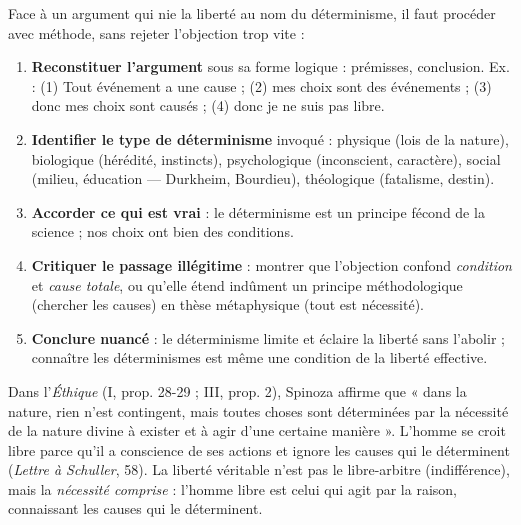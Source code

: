 \documentclass[11pt]{article}
\begin{document}
\begin{methode}
Face à un argument qui nie la liberté au nom du déterminisme, il faut procéder avec méthode, sans rejeter l'objection trop vite :
\begin{enumerate}
\item \textbf{Reconstituer l'argument} sous sa forme logique : prémisses, conclusion. Ex. : (1) Tout événement a une cause ; (2) mes choix sont des événements ; (3) donc mes choix sont causés ; (4) donc je ne suis pas libre.
\item \textbf{Identifier le type de déterminisme} invoqué : physique (lois de la nature), biologique (hérédité, instincts), psychologique (inconscient, caractère), social (milieu, éducation — Durkheim, Bourdieu), théologique (fatalisme, destin).
\item \textbf{Accorder ce qui est vrai} : le déterminisme est un principe fécond de la science ; nos choix ont bien des conditions.
\item \textbf{Critiquer le passage illégitime} : montrer que l'objection confond \emph{condition} et \emph{cause totale}, ou qu'elle étend indûment un principe méthodologique (chercher les causes) en thèse métaphysique (tout est nécessité).
\item \textbf{Conclure nuancé} : le déterminisme limite et éclaire la liberté sans l'abolir ; connaître les déterminismes est même une condition de la liberté effective.
\end{enumerate}
\end{methode}

\begin{propriete}
Dans l'\emph{Éthique} (I, prop. 28-29 ; III, prop. 2), Spinoza affirme que « dans la nature, rien n'est contingent, mais toutes choses sont déterminées par la nécessité de la nature divine à exister et à agir d'une certaine manière ». L'homme se croit libre parce qu'il a conscience de ses actions et ignore les causes qui le déterminent (\emph{Lettre à Schuller}, 58). La liberté véritable n'est pas le libre-arbitre (indifférence), mais la \emph{nécessité comprise} : l'homme libre est celui qui agit par la raison, connaissant les causes qui le déterminent.
\end{propriete}
\end{document}
